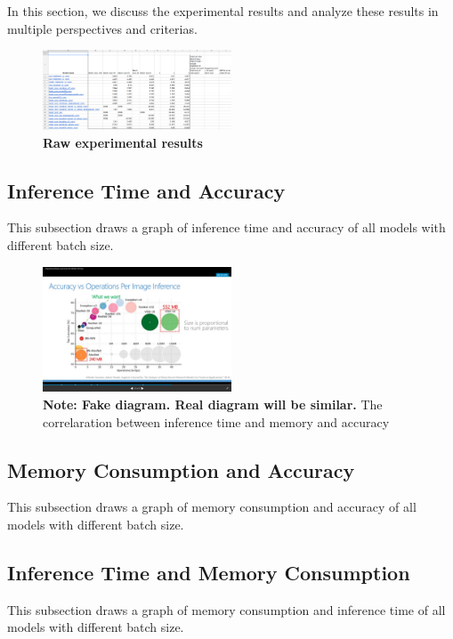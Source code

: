 \documentclass[conference]{IEEEtran}
\begin{document}

In this section, we discuss the experimental results and analyze these results in multiple perspectives and criterias.

\begin{figure}[htpb]
	  \centering
	  \includegraphics[width=0.5\textwidth]{experimental_results}
	  \caption{\textbf{Raw experimental results}}
	  \label{fig:experimental_results}
\end{figure}

\subsection{Inference Time and Accuracy}
This subsection draws a graph of inference time and accuracy of all models with different batch size.

\begin{figure}[htpb]
	  \centering
	  \includegraphics[width=0.5\textwidth]{time-memory-accuracy}
	  \caption{\textbf{Note: Fake diagram. Real diagram will be similar.} The correlaration between inference time and memory and accuracy}
	  \label{fig:time-memory-accuracy}
\end{figure}


\subsection{Memory Consumption and Accuracy}
This subsection draws a graph of memory consumption and accuracy of all models with different batch size.

\subsection{Inference Time and Memory Consumption}
This subsection draws a graph of memory consumption and inference time of all models with different batch size.
\end{document}
